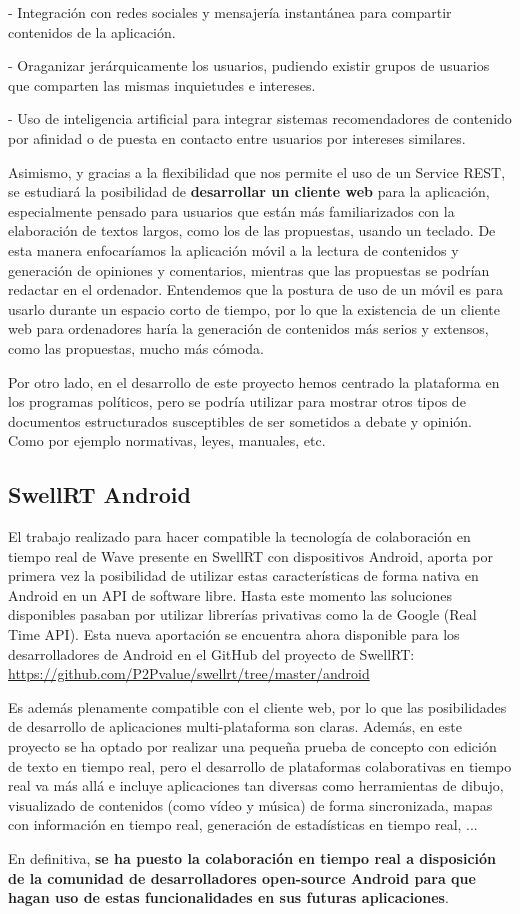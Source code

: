 - Integración con redes sociales y mensajería instantánea para compartir contenidos de la aplicación.

- Oraganizar jerárquicamente los usuarios, pudiendo existir grupos de usuarios que comparten las mismas inquietudes e intereses.

- Uso de inteligencia artificial para integrar sistemas recomendadores de contenido por afinidad o de puesta en contacto entre usuarios por intereses similares.
 
Asimismo, y gracias a la flexibilidad que nos permite el uso de un Service REST, se estudiará la posibilidad de \textbf{desarrollar un cliente web} para la aplicación, especialmente pensado para usuarios que están más familiarizados con la elaboración de textos largos, como los de las propuestas, usando un teclado. De esta manera enfocaríamos la aplicación móvil a la lectura de contenidos y generación de opiniones y comentarios, mientras que las propuestas se podrían redactar en el ordenador. Entendemos que la postura de uso de un móvil es para usarlo durante un espacio corto de tiempo, por lo que la existencia de un cliente web para ordenadores haría la generación de contenidos más serios y extensos, como las propuestas, mucho más cómoda.

Por otro lado, en el desarrollo de este proyecto hemos centrado la plataforma en los programas políticos, pero se podría utilizar para mostrar otros tipos de documentos estructurados susceptibles de ser sometidos a debate y opinión. Como por ejemplo normativas, leyes, manuales, etc.

\subsection{SwellRT Android}

El trabajo realizado para hacer compatible la tecnología de colaboración en tiempo real de Wave presente en SwellRT con dispositivos Android, aporta por primera vez la posibilidad de utilizar estas características de forma nativa en Android en un API de software libre. Hasta este momento las soluciones disponibles pasaban por utilizar librerías privativas como la de Google (Real Time API). Esta nueva aportación se encuentra ahora disponible para los desarrolladores de Android en el GitHub del proyecto de SwellRT: \url{https://github.com/P2Pvalue/swellrt/tree/master/android}

Es además plenamente compatible con el cliente web, por lo que las posibilidades de desarrollo de aplicaciones multi-plataforma son claras. Además, en este proyecto se ha optado por realizar una pequeña prueba de concepto con edición de texto en tiempo real, pero el desarrollo de plataformas colaborativas en tiempo real va más allá e incluye aplicaciones tan diversas como herramientas de dibujo, visualizado de contenidos (como vídeo y música) de forma sincronizada, mapas con información en tiempo real, generación de estadísticas en tiempo real, ...

En definitiva, \textbf{se ha puesto la colaboración en tiempo real a disposición de la comunidad de desarrolladores open-source Android para que hagan uso de estas funcionalidades en sus futuras aplicaciones}.




